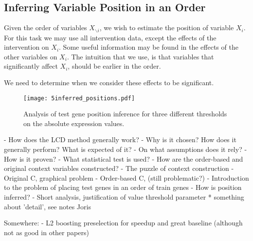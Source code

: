 \subsection{Inferring Variable Position in an Order}

Given the order of variables $X_{\backslash i}$, we wish to estimate the position of variable $X_i$. For this task we may use all intervention data, except the effects of the intervention on $X_i$. Some useful information may be found in the effects of the other variables on $X_i$. The intuition that we use, is that variables that significantly affect $X_i$, should be earlier in the order. 

We need to determine when we consider these effects to be significant. 






\begin{figure}[]
    \centering
    \texttt{[image: 5inferred\_positions.pdf]}
    \caption{Analysis of test gene position inference for three different thresholds on the absolute expression values.}
    \label{fig:5:positions}
\end{figure}



- How does the LCD method generally work?
    - Why is it chosen? How does it generally perform? What is expected of it?
    - On what assumptions does it rely?
    - How is it proven?
    - What statistical test is used?
- How are the order-based and original context variables constructed?
    - The puzzle of context construction
    - Original C, graphical problem
    - Order-based C, (still problematic?)
    - Introduction to the problem of placing test genes in an order of train genes
    - How is position inferred?
    - Short analysis, justification of value threshold parameter
    * something about 'detail', see notes Joris

Somewhere:
- L2 boosting preselection for speedup and great baseline (although not as good in other papers)






